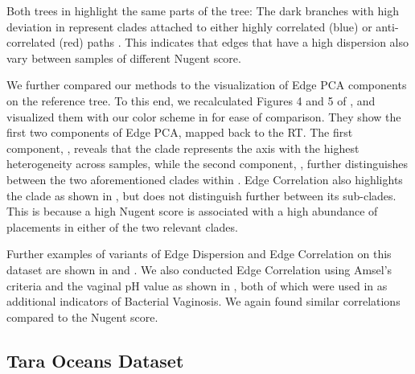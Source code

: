 Both trees in  highlight the same parts of the tree:
The dark branches with high deviation in  represent clades
attached to either highly correlated (blue) or anti-correlated (red) paths .
This indicates that edges that have a high dispersion
also vary between samples of different Nugent score.

We further compared our methods to the visualization of Edge PCA components on the reference tree.
To this end, we recalculated Figures 4 and 5 of \cite{Matsen2011a},
and visualized them with our color scheme in  for ease of comparison.
They show the first two components of Edge PCA, mapped back to the \ac{RT}.
The first component, ,
reveals that the  clade represents the axis with the highest heterogeneity across samples,
while the second component, ,
further distinguishes between the two aforementioned clades within .
Edge Correlation also highlights the  clade as shown in ,
but does not distinguish further between its sub-clades.
This is because a high Nugent score is associated
with a high abundance of placements in either of the two relevant  clades.

Further examples of variants of Edge Dispersion and Edge Correlation on this dataset
are shown in  and .
We also conducted Edge Correlation using Amsel's criteria \cite{Amsel1983} and the vaginal pH value as shown in ,
both of which were used in \cite{Srinivasan2012} as additional indicators of Bacterial Vaginosis.
We again found similar correlations compared to the Nugent score.


\subsection{Tara Oceans Dataset}
\label{ch:Visualization:sec:Results:sub:TaraDataset}

